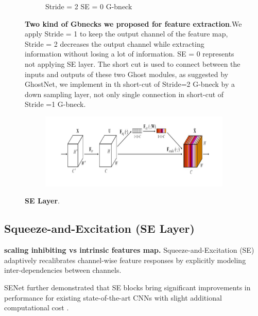 \begin{figure}[h]
\begin{center}
\begin{subfigure}[b]{0.49\textwidth}
			\caption{Stride = 2 SE = 0 G-bneck}
			\label{fig:cellnet}
		\end{subfigure}
	\end{center}
	\caption{\textbf{Two kind of Gbnecks we proposed for feature extraction}.We apply Stride = 1 to keep the output channel of the feature map, Stride = 2 decreases the output channel while extracting information without losing a lot of information. SE = 0 represents not applying SE layer.  The short cut is used to connect between the inputs and outputs of these two Ghost modules, as suggested by GhostNet, we implement in th short-cut of Stride=2 G-bneck by a down sampling layer, not only single connection in short-cut of Stride =1 G-bneck.}
\end{figure}

\begin{figure}[h]
	\begin{center}
		\begin{subfigure}[b]{\textwidth}
		    \centering
			\includegraphics[width=\textwidth]{thesis-template-master/images/SElayer.png}
			\label{fig:cellnet}
		\end{subfigure}
	\end{center}
	\caption{\textbf{SE Layer}.}
\end{figure}

\subsection{Squeeze-and-Excitation (SE Layer)} %
\label{sub:amet}

\textbf{scaling inhibiting vs intrinsic features map.} Squeeze-and-Excitation (SE)\cite{24} adaptively recalibrates channel-wise feature responses by explicitly modeling inter-dependencies between channels. 

SENet further demonstrated that SE blocks bring significant improvements in performance for existing state-of-the-art CNNs with slight additional computational cost \cite{24}. 



